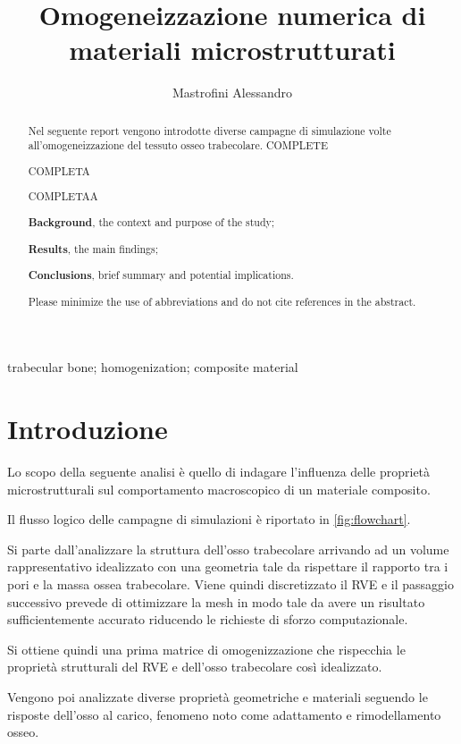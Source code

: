 \documentclass[a4paper,num-refs]{oup-contemporary}
\title{Omogeneizzazione numerica di materiali microstrutturati}
\author{Mastrofini Alessandro}
\begin{document}
\begin{frontmatter}
\maketitle
\begin{abstract}

Nel seguente report vengono introdotte diverse campagne di simulazione volte all'omogeneizzazione del tessuto osseo trabecolare. 
COMPLETE

COMPLETA

COMPLETAA


 \textbf{Background}, the context and purpose of the study;
 
  \textbf{Results}, the main findings;
  
   \textbf{Conclusions}, brief summary and potential implications. 
   
   Please minimize the use of abbreviations and do not cite references in the abstract.
\end{abstract}

\begin{keywords}
trabecular bone; homogenization; composite material
\end{keywords}
\end{frontmatter}



\section{Introduzione}

Lo scopo della seguente analisi è quello di indagare l'influenza delle proprietà microstrutturali sul comportamento macroscopico di un materiale composito.

Il flusso logico delle campagne di simulazioni è riportato in \cref{fig:flowchart}. 

Si parte dall'analizzare la struttura dell'osso trabecolare arrivando ad un volume rappresentativo idealizzato con una geometria tale da rispettare il rapporto tra i pori e la massa ossea trabecolare. Viene quindi discretizzato il RVE e il passaggio successivo prevede di ottimizzare la mesh in modo tale da avere un risultato sufficientemente accurato riducendo le richieste di sforzo computazionale. 

Si ottiene quindi una prima matrice di omogenizzazione che rispecchia le proprietà strutturali del RVE e dell'osso trabecolare così idealizzato. 

Vengono poi analizzate diverse proprietà geometriche e materiali seguendo le risposte dell'osso al carico, fenomeno noto come adattamento e rimodellamento osseo. 
\end{document}
